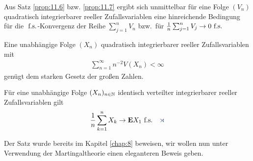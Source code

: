 \begin{bem}
\label{bem:11.2}
Aus Satz \ref{prop:11.6} bzw. \ref{prop:11.7} ergibt sich unmittelbar für eine
Folge $(V_{n})$ quadratisch integrierbarer reeller Zufallsvariablen eine hinreichende
Bedingung für die $\ \text{f.s.}$-Konvergenz der Reihe $\sum_{j=1}^n V_{n}$ bzw.\ für
$\frac{1}{n} \sum^{n}_{j=1} V_{j}\to 0 \ \text{f.s.}$\fishhere
\end{bem}  

\begin{prop}
\label{prop:11.8}
Eine unabhängige Folge $(X_{n})$ quadratisch integrierbarer reeller
Zufallsvariablen mit
\begin{align*}
\sum\limits^ {\infty}_{n=1} n^ {-2} V(X_{n})< \infty
\end{align*}
genügt dem starken Gesetz der großen Zahlen.\fishhere
\end{prop}

\begin{prop}
\label{prop:11.9}
Für eine unabhängige Folge $(X_{n})_{n\in\mathbb{N}}$ identisch verteilter
integrierbarer reeller Zufallsvariablen gilt
\begin{align*}
\frac{1}{n} \sum\limits^ {n}_{k=1}X_{k} \to \E X_{1} \fs\fishhere
\end{align*}
\end{prop}

Der Satz wurde bereits im Kapitel \ref{chap:8} beweisen, wir wollen nun unter
Verwendung der Martingaltheorie einen eleganteren Beweis geben.

